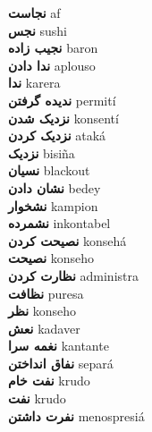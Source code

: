 \textbf{ نجاست  } af \\
\textbf{ نجس  } sushi \\
\textbf{ نجیب زاده  } baron \\
\textbf{ ندا دادن  } aplouso \\
\textbf{ ندا  } karera \\
\textbf{ ندیده گرفتن  } permití \\
\textbf{ نزدیک شدن  } konsentí \\
\textbf{ نزدیک کردن  } ataká \\
\textbf{ نزدیک  } bisiña \\
\textbf{ نسیان  } blackout \\
\textbf{ نشان دادن  } bedey \\
\textbf{ نشخوار  } kampion \\
\textbf{ نشمرده  } inkontabel \\
\textbf{ نصیحت کردن  } konsehá \\
\textbf{ نصیحت  } konseho \\
\textbf{ نظارت کردن  } administra \\
\textbf{ نظافت  } puresa \\
\textbf{ نظر  } konseho \\
\textbf{ نعش  } kadaver \\
\textbf{ نغمه سرا  } kantante \\
\textbf{ نفاق انداختن  } separá \\
\textbf{ نفت خام  } krudo \\
\textbf{ نفت  } krudo \\
\textbf{ نفرت داشتن  } menospresiá \\
